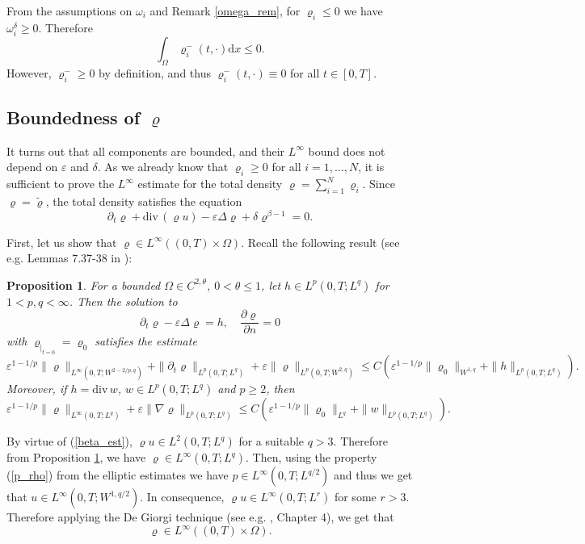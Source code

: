 \documentclass[11pt]{article}
\newcommand{\dd}{\mathrm{d}}
\newcommand{\ddiv}{\mathrm{div\,}}
\newtheorem{prop}[tw]{Proposition}
\numberwithin{equation}{section}
\numberwithin{tw}{section}
\begin{document}
From the assumptions on $\omega_i$ and Remark \ref{omega_rem}, for $\varrho_i\leq 0$ we have $\omega_i^\delta\geq 0$. Therefore 
\[ \int_\Omega \varrho_i^-(t,\cdot)\dd x \leq 0. \]
However, $\varrho_i^-\geq 0$ by definition, and thus $\varrho_i^-(t,\cdot)\equiv 0$ for all $t\in [0,T]$.

\subsection{Boundedness of $\varrho$}

It turns out that all components are bounded, and their $L^\infty$ bound does not depend on $\varepsilon$ and $\delta$. As we already know that $\varrho_i\geq 0$ for all $i=1,\dots,N$, it is sufficient to prove the $L^\infty$ estimate for the total density $\varrho=\sum_{i=1}^N\varrho_i$. Since $\varrho=\tilde\varrho$, the total density satisfies the equation
\[ \partial_t\varrho + \ddiv(\varrho u)-\varepsilon\Delta\varrho + \delta\varrho^{\beta-1} = 0. \]

First, let us show that $\varrho\in L^\infty((0,T)\times\Omega)$. Recall the following result (see e.g. Lemmas 7.37-38 in \cite{novotny-straskraba}):

\begin{prop}\label{parabolic_th}
For a bounded $\Omega\in C^{2,\theta}$, $0<\theta\leq 1$, let $h\in L^p(0,T;L^q)$ for $1<p,q<\infty$. Then the solution to
\[ \partial_t\varrho -\varepsilon\Delta\varrho = h, \quad \frac{\partial\varrho}{\partial n}=0 \]
with $\varrho_{|_{t=0}}=\varrho_0$ satisfies the estimate
\begin{equation}\label{parabolic_est} \varepsilon^{1-1/p}\|\varrho\|_{L^\infty(0,T;W^{2-{2/p},q})} + \|\partial_t\varrho\|_{L^p(0,T;L^q)} + \varepsilon\|\varrho\|_{L^p(0,T;W^{2,q})} \leq C \left(\varepsilon^{1-1/p}\|\varrho_0\|_{W^{1,q}} + \|h\|_{L^p(0,T;L^q)}\right). \end{equation}
Moreover, if $h=\ddiv w$, $w\in L^p(0,T;L^q)$ and $p\geq 2$, then
\begin{equation}\label{parabolic_est2} \varepsilon^{1-1/p}\|\varrho\|_{L^\infty(0,T;L^q)} + \varepsilon\|\nabla\varrho\|_{L^p(0,T;L^q)} \leq C\left(\varepsilon^{1-1/p}\|\varrho_0\|_{L^q} + \|w\|_{L^p(0,T;L^q)}\right). \end{equation}
\end{prop}

By virtue of (\ref{beta_est}), $\varrho u\in L^2(0,T;L^q)$ for a suitable $q>3$. Therefore from Proposition \ref{parabolic_th}, we have $\varrho \in L^\infty(0,T;L^q).$
Then, using the property (\ref{p_rho})
from the elliptic estimates we have $p\in L^\infty(0,T;L^{q/2})$ and thus
we get that $u\in L^\infty(0,T;W^{1,q/2}).$
In consequence, 
$\varrho u\in L^\infty(0,T;L^r)$
for some $r>3$. Therefore applying the De Giorgi  technique (see e.g. \cite{wu-yin-wang}, Chapter 4), we get that
\[ \varrho \in L^\infty((0,T)\times\Omega). \]
\end{document}
